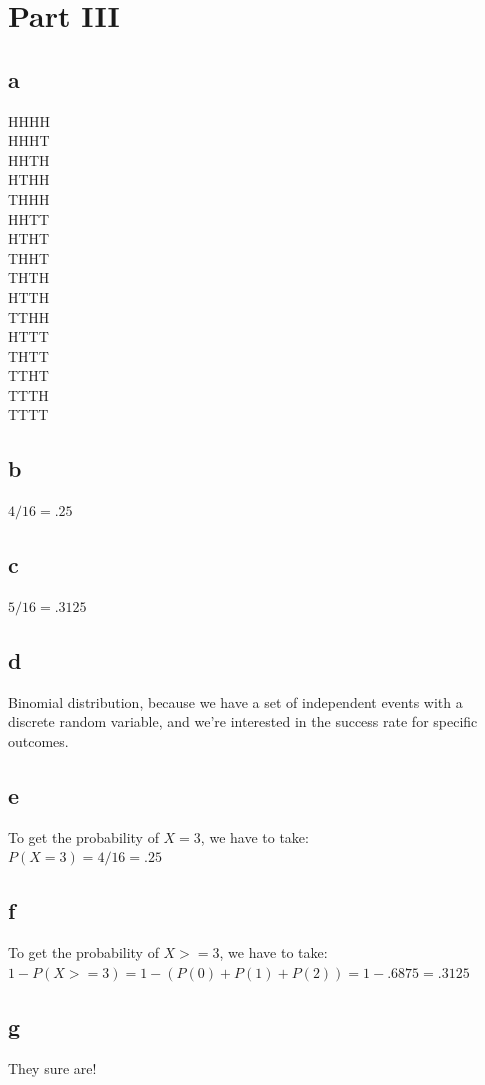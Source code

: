 \documentclass[10pt,letterpaper]{article}
\begin{document}
\section*{Part III}
\subsection*{a}
HHHH\\
HHHT\\
HHTH\\
HTHH\\
THHH\\
HHTT\\
HTHT\\
THHT\\
THTH\\
HTTH\\
TTHH\\
HTTT\\
THTT\\
TTHT\\
TTTH\\
TTTT\\
\subsection*{b}
$4/16=.25$
\subsection*{c}
$5/16=.3125$
\subsection*{d}
Binomial distribution, because we have a set of independent events with a discrete
random variable, and we're interested in the success rate for specific outcomes.
\subsection*{e}
To get the probability of $X = 3$, we have to take:\\
$P(X=3) = 4/16 = .25$
\subsection*{f}
To get the probability of $X >= 3$, we have to take:\\
$1-P(X>=3) = 1-(P(0)+P(1)+P(2)) = 1-.6875 = .3125$
\subsection*{g}
They sure are!
\end{document}
